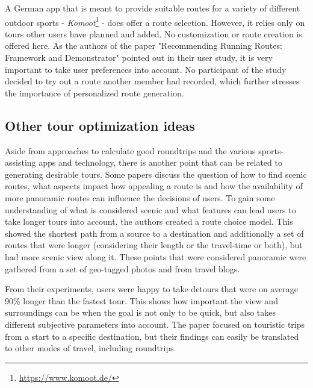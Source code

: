 A German app that is meant to provide suitable routes for a variety of different outdoor sports - \textit{Komoot}\footnote{\url{https://www.komoot.de/}} - does offer a route selection. 
However, it relies only on tours other users have planned and added. No customization or route creation is offered here. 
As the authors of the paper "Recommending Running Routes: Framework and Demonstrator"\cite{loepp_recommending_nodate} pointed out in their user study, it is very important to take user preferences into account. 
No participant of the study decided to try out a route another member had recorded, which further stresses the importance of personalized route generation\cite{loepp_recommending_nodate}.

\subsection{Other tour optimization ideas}
\label{subsec:otherTourOptimization}

Aside from approaches to calculate good roundtrips and the various sports-assisting apps and technology, there is another point that can be related to generating desirable tours.
Some papers discuss the question of how to find scenic routes, what aspects impact how appealing a route is and how the availability of more panoramic routes can influence the decisions of users.
To gain some understanding of what is considered scenic and what features can lead users to take longer tours into account, the authors created a route choice model.
This showed the shortest path from a source to a destination and additionally a set of routes that were longer (considering their length or the travel-time or both), but had more scenic view along it.
These points that were considered panoramic were gathered from a set of geo-tagged photos and from travel blogs. \cite{alivand_analyzing_2015}

From their experiments, users were happy to take detours that were on average 90\% longer than the fastest tour.
This shows how important the view and surroundings can be when the goal is not only to be quick, but also takes different subjective parameters into account.
The paper focused on touristic trips from a start to a specific destination, but their findings can easily be translated to other modes of travel, including roundtrips. \cite{alivand_analyzing_2015}
